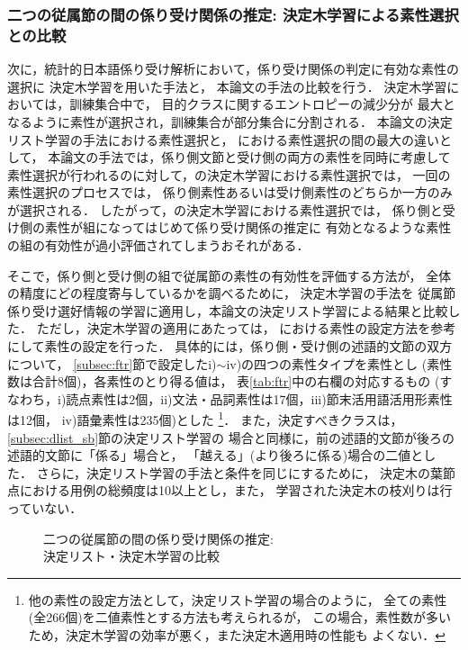 \vspace{-4mm}
\subsubsection{二つの従属節の間の係り受け関係の推定: 決定木学習による素性選択との比較}
\label{subsubsec:dtree}

次に，統計的日本語係り受け解析において，係り受け関係の判定に有効な素性の選択に
決定木学習\cite{Quinlan93a}を用いた手法\cite{Haruno98cj}と，
本論文の手法の比較を行う．
決定木学習においては，訓練集合中で，
目的クラスに関するエントロピーの減少分が
最大となるように素性が選択され，訓練集合が部分集合に分割される．
本論文の決定リスト学習の手法における素性選択と，
\cite{Haruno98cj}における素性選択の間の最大の違いとして，
本論文の手法では，係り側文節と受け側の両方の素性を同時に考慮して
素性選択が行われるのに対して，\cite{Haruno98cj}の決定木学習における素性選択では，
一回の素性選択のプロセスでは，
係り側素性あるいは受け側素性のどちらか一方のみが選択される．
したがって，\cite{Haruno98cj}の決定木学習における素性選択では，
係り側と受け側の素性が組になってはじめて係り受け関係の推定に
有効となるような素性の組の有効性が過小評価されてしまうおそれがある．

そこで，係り側と受け側の組で従属節の素性の有効性を評価する方法が，
全体の精度にどの程度寄与しているかを調べるために，
決定木学習の手法\cite{Quinlan93a}を
従属節係り受け選好情報の学習に適用し，本論文の決定リスト学習による結果と比較した．
ただし，決定木学習\cite{Quinlan93a}の適用にあたっては，
\cite{Haruno98cj}における素性の設定方法を参考にして素性の設定を行った．
具体的には，係り側・受け側の述語的文節の双方について，
\ref{subsec:ftr}節で設定したi)$\sim$iv)の四つの素性タイプを素性とし
(素性数は合計8個)，各素性のとり得る値は，
表\ref{tab:ftr}中の右欄の対応するもの
(すなわち，i)読点素性は2個，ii)文法・品詞素性は17個，iii)節末活用語活用形素性は12個，
iv)語彙素性は235個)とした
\footnote{
  他の素性の設定方法として，決定リスト学習の場合のように，
  全ての素性(全266個)を二値素性とする方法も考えられるが，
  この場合，素性数が多いため，決定木学習の効率が悪く，また決定木適用時の性能も
  よくない．
}．
また，決定すべきクラスは，\ref{subsec:dlist_sb}節の決定リスト学習の
場合と同様に，前の述語的文節が後ろの述語的文節に「係る」場合と，
「越える」(より後ろに係る)場合の二値とした．
さらに，決定リスト学習の手法と条件を同じにするために，
決定木の葉節点における用例の総頻度は10以上とし，また，
学習された決定木の枝刈りは行っていない．



\begin{figure}
  \begin{center}
        \caption{二つの従属節の間の係り受け関係の推定:\\ 決定リスト・決定木学習の比較}
        \label{fig:res_dtree}
  \end{center}
\end{figure}


